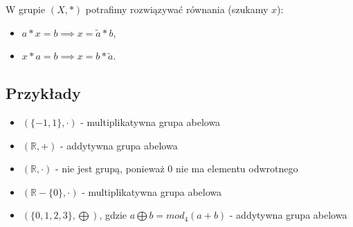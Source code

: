 \documentclass{article}
\begin{document}
W grupie $(X, *)$ potrafimy rozwiązywać równania (szukamy $x$):
\begin{itemize}
    \item $a * x = b \implies x = \tilde{a} * b$,
    \item $x * a = b \implies x = b * \tilde{a}$.
\end{itemize}

\subsection{Przykłady}
\begin{itemize}
    \item $(\{-1, 1\}, \cdot)$ - multiplikatywna grupa abelowa
    \item $(\mathbb{R}, +)$ - addytywna grupa abelowa
    \item $(\mathbb{R}, \cdot)$ - nie jest grupą, ponieważ 0 nie ma elementu odwrotnego
    \item $(\mathbb{R} - \{0\}, \cdot)$ - multiplikatywna grupa abelowa
    \item $(\{0, 1, 2, 3\}, \bigoplus)$, gdzie $a \bigoplus b = mod_{4}(a + b)$ - addytywna grupa abelowa
\end{itemize}

\end{document}
